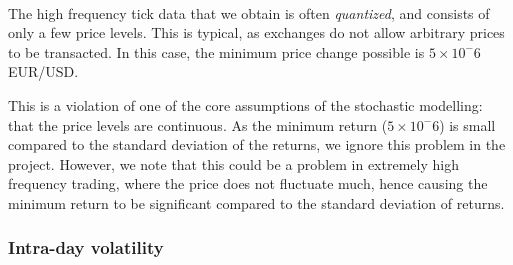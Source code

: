 \documentclass[../main.tex]{subfiles}
\begin{document}
\begin{figure}[h!]
	\centering
	\\
	\label{fig:3__2__1__example_waveform_plots}
\end{figure}


The high frequency tick data that we obtain is often \textit{quantized}, and consists of only a few price levels. This is typical, as exchanges do not allow arbitrary prices to be transacted. In this case, the minimum price change possible is $5 \times 10^-6$ EUR/USD. 

This is a violation of one of the core assumptions of the stochastic modelling: that the price levels are continuous. As the minimum return ($5 \times 10^-6$) is small compared to the standard deviation of the returns, we ignore this problem in the project. However, we note that this could be a problem in extremely high frequency trading, where the price does not fluctuate much, hence causing the minimum return to be significant compared to the standard deviation of returns. 

\subsubsection{Intra-day volatility}
\end{document}
